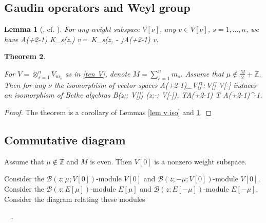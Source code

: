 \documentclass[12pt]{amsart}
\newtheorem{thm}{Theorem}[section]
\newtheorem{lem}[thm]{Lemma}
\numberwithin{equation}{section}
\theoremstyle{definition}
\let\mc\mathcal
\let\ox\otimes
\def\Z{{\mathbb Z}}
\def\B{{\mc B}}
\def\K{{\mc K}}
\begin{document}
\subsection{Gaudin operators and Weyl group}



\begin{lem}
[{\cite[Lemma 18]{TV}},  cf. {\cite[Lemma 5.5]{MV2}}]
\label{lem AK}
For any weight subspace $V[\nu]$, any $v\in V[\nu]$, $s=1,\dots,n$, we have
\bean
\label{AK}
\mc A\Big(\mu +\frac {\nu}2-1\Big) \K_s(z,\mu) v\,=\,
 \K_s(z, - \mu)\mc A\Big(\mu +\frac {\nu}2-1\Big) v.
 \eean
 
 
\end{lem}


\begin{thm}
\label{thm isom mu}

For  $V= \ox_{s=1}^n V_{m_s}$ as in \eqref{ten V}, denote $M=\sum_{s=1}^n m_s$. 
Assume that $\mu \notin \frac M2+\Z$. 
Then for any $\nu$ the isomorphism of vector spaces
\bean
\label{A mu n}
\mc A\Big(\mu +\frac {\nu}2-1\Big)\Big\vert_{V[\nu]}\,:\,V[\nu]\,\to\,V[-\nu]
\eean
induces  an isomorphism of  Bethe algebras
\bean
\label{B iso}
\phantom{aaa}
\B(z;\mu; V[\nu]) \to  \B(z;-\mu; V[-\nu]), \quad
T\mapsto\mc A\Big(\mu +\frac {\nu}2-1\Big) T
\mc A\Big(\mu +\frac {\nu}2-1\Big)^{-1}.
\eean


\end{thm}

\begin{proof}
The theorem is a corollary of Lemmas    \ref{lem v iso} and \ref{lem AK}.
\end{proof}


\subsection{Commutative diagram}

Assume that $\mu\notin\Z$ and $M$ is even. Then $V[0]$ is a nonzero weight subspace.

\smallskip

Consider the $\B(z;\mu;V[0])$-module $V[0]$ and $\B(z;-\mu;V[0])$-module $V[0]$.
 Consider the $\B(z; E[\mu])$-module $E[\mu]$ and $\B(z; E[-\mu])$-module $E[-\mu]$.
Consider the diagram relating these modules
\bean
\label{comD}
\ \  .
\eean
\end{document}
